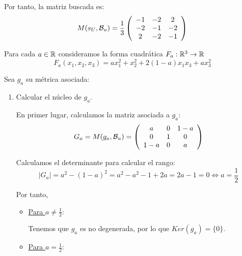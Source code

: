 \begin{ejercicio}
\begin{enumerate}
        Por tanto, la matriz buscada es:
        \begin{equation*}
            M(s_U, \mathcal{B}_u) = \frac{1}{3}\left(\begin{array}{ccc}
                -1 & -2 & 2 \\
                -2 & -1 & -2\\
                2 & -2 & -1
            \end{array}\right)
        \end{equation*}
    \end{enumerate}
\end{ejercicio}



\begin{ejercicio}
    Para cada $a\in \mathbb{R}$ consideramos la forma cuadrática $F_a:\mathbb{R}^3\to \mathbb{R}$
    \begin{equation*}
        F_a(x_1, x_2, x_3) = ax_1^2 + x_2^2 + 2(1 - a)x_1x_3 + ax_3^2
    \end{equation*}

    Sea $g_a$ su métrica asociada:
    \begin{enumerate}
        \item Calcular el núcleo de $g_a$.

        En primer lugar, calculamos la matriz asociada a $g_a$:
        \begin{equation*}
            G_a = M(g_a, \mathcal{B}_u) = \left(\begin{array}{ccc}
                a & 0 & 1-a \\
                0 & 1 & 0 \\
                1-a & 0 & a
            \end{array}\right)
        \end{equation*}

        Calculamos el determinante para calcular el rango:
        \begin{equation*}
            |G_a| = a^2 -(1-a)^2 = a^2 -a^2 -1 +2a = 2a-1 = 0\Longleftrightarrow a=\frac{1}{2}
        \end{equation*}

        Por tanto,
        \begin{itemize}
            \item \underline{Para $a\neq \frac{1}{2}$}:

            Tenemos que $g_a$ es no degenerada, por lo que $Ker(g_a)=\{0\}$.

            \item \underline{Para $a = \frac{1}{2}$}:


\end{itemize}
\end{enumerate}
\end{ejercicio}
